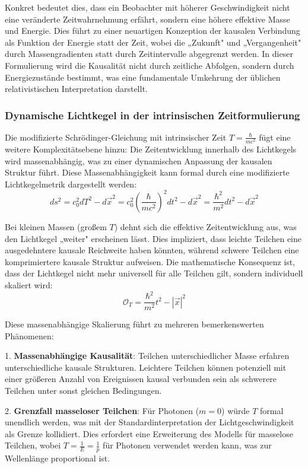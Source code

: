 \documentclass[a4paper,12pt]{article}
\begin{document}
Konkret bedeutet dies, dass ein Beobachter mit höherer Geschwindigkeit nicht eine veränderte Zeitwahrnehmung erfährt, sondern eine höhere effektive Masse und Energie. Dies führt zu einer neuartigen Konzeption der kausalen Verbindung als Funktion der Energie statt der Zeit, wobei die „Zukunft" und „Vergangenheit" durch Massengradienten statt durch Zeitintervalle abgegrenzt werden. In dieser Formulierung wird die Kausalität nicht durch zeitliche Abfolgen, sondern durch Energiezustände bestimmt, was eine fundamentale Umkehrung der üblichen relativistischen Interpretation darstellt.

\subsubsection{Dynamische Lichtkegel in der intrinsischen Zeitformulierung}
Die modifizierte Schrödinger-Gleichung mit intrinsischer Zeit \( T = \frac{\hbar}{m c^2} \) fügt eine weitere Komplexitätsebene hinzu: Die Zeitentwicklung innerhalb des Lichtkegels wird massenabhängig, was zu einer dynamischen Anpassung der kausalen Struktur führt. Diese Massenabhängigkeit kann formal durch eine modifizierte Lichtkegelmetrik dargestellt werden:
\begin{equation}
	ds^2 = c_0^2 dT^2 - d\vec{x}^2 = c_0^2 \left(\frac{\hbar}{m c^2}\right)^2 dt^2 - d\vec{x}^2 = \frac{\hbar^2}{m^2} dt^2 - d\vec{x}^2
\end{equation}

Bei kleinen Massen (großem \( T \)) dehnt sich die effektive Zeitentwicklung aus, was den Lichtkegel „weiter" erscheinen lässt. Dies impliziert, dass leichte Teilchen eine ausgedehntere kausale Reichweite haben könnten, während schwere Teilchen eine komprimiertere kausale Struktur aufweisen. Die mathematische Konsequenz ist, dass der Lichtkegel nicht mehr universell für alle Teilchen gilt, sondern individuell skaliert wird:
\begin{equation}
	\mathcal{O}_T = \frac{\hbar^2}{m^2} t^2 - |\vec{x}|^2
\end{equation}

Diese massenabhängige Skalierung führt zu mehreren bemerkenswerten Phänomenen:

1. \textbf{Massenabhängige Kausalität}: Teilchen unterschiedlicher Masse erfahren unterschiedliche kausale Strukturen. Leichtere Teilchen können potenziell mit einer größeren Anzahl von Ereignissen kausal verbunden sein als schwerere Teilchen unter sonst gleichen Bedingungen.

2. \textbf{Grenzfall masseloser Teilchen}: Für Photonen (\( m = 0 \)) würde \( T \) formal unendlich werden, was mit der Standardinterpretation der Lichtgeschwindigkeit als Grenze kollidiert. Dies erfordert eine Erweiterung des Modells für masselose Teilchen, wobei \( T = \frac{1}{E} = \frac{1}{p} \) für Photonen verwendet werden kann, was zur Wellenlänge proportional ist.
\end{document}
